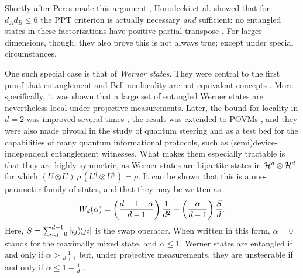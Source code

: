 		Shortly after Peres made this argument \cite{peres_1996_ppt}, Horodecki et al. showed that for $d_A d_B \leq 6$ the PPT criterion is actually necessary \emph{and} sufficient: no entangled states in these factorizations have positive partial transpose \cite{horodecki_1996_ppt}. For larger dimensions, though, they also prove this is not always true; except under special circumstances.
	
		One such special case is that of \emph{Werner states}. They were central to the first proof that entanglement and Bell nonlocality are not equivalent concepts \cite{werner_1989}. More specifically, it was shown that a large set of entangled Werner states are nevertheless local under projective measurements. Later, the bound for locality in $d=2$ was improved several times \cite{acin_2006_grothendieck,vertesi_2008_moreefficient,hirsch_2017_betterlocalhidden}, the result was extended to POVMs \cite{barrett_2002_povmslocality}, and they were also made pivotal in the study of quantum steering \cite{wiseman_2007_steering} and as a test bed for the capabilities of many quantum informational protocols, such as (semi)device-independent entanglement witnesses. What makes them especially tractable is that they are highly symmetric, as Werner states are bipartite states in $\mathcal{H}^{d} \otimes \mathcal{H}^{d}$ for which $(U \otimes U) \,\rho\, (U^\dagger \otimes U^\dagger) = \rho$. It can be shown that this is a one-parameter family of states, and that they may be written as
		\begin{equation}
			W_d(\alpha) = \left( \frac{d-1+\alpha}{d-1} \right) \frac{\mathbf{1}}{d^2} - \left( \frac{\alpha}{d-1} \right) \frac{S}{d} .
			\label{eq:werner-states}
		\end{equation}
		Here, $S = \sum_{i,j=0}^{d-1} \ketbra{ij}{ji}$ is the swap operator. When written in this form, $\alpha = 0$ stands for the maximally mixed state, and $\alpha \leq 1$. Werner states are entangled if and only if $\alpha > \frac{1}{d+1}$ but, under projective measurements, they are unsteerable if and only if $\alpha \leq 1 - \frac{1}{d}$ \cite{wiseman_2007_steering}. 
	
